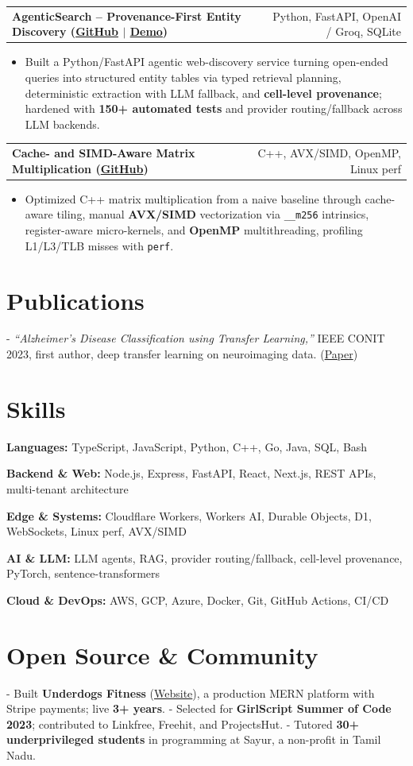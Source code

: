\documentclass[letterpaper,11pt]{article}
\makeatletter
\newcommand{\projItem}[2]{%
  \vspace{2pt}
  \begin{tabular*}{\textwidth}{@{}l@{\extracolsep{\fill}}r@{}}
    \textbf{#1} & #2 \\
  \end{tabular*}\par\vspace{-3pt}
}
\newcommand{\skillLine}[2]{\textbf{#1:} #2\par\vspace{1.5pt}}
\newcommand{\inlineBlock}[1]{{\setlength{\leftskip}{0.18in}\small #1\par}}
\makeatother
\begin{document}
\projItem{AgenticSearch -- Provenance-First Entity Discovery {\normalfont\small(\href{https://github.com/Deva-1903/ciir_agentic_search}{GitHub} $\vert$ \href{https://agentic-search-negglszkwa-uc.a.run.app}{Demo})}}{Python, FastAPI, OpenAI / Groq, SQLite}
\begin{itemize}
  \item Built a Python/FastAPI agentic web-discovery service turning open-ended queries into structured entity tables via typed retrieval planning, deterministic extraction with LLM fallback, and \textbf{cell-level provenance}; hardened with \textbf{150+ automated tests} and provider routing/fallback across LLM backends.
\end{itemize}

\projItem{Cache- and SIMD-Aware Matrix Multiplication {\normalfont\small(\href{https://github.com/Deva-1903/cs690pf}{GitHub})}}{C++, AVX/SIMD, OpenMP, Linux perf}
\begin{itemize}
  \item Optimized C++ matrix multiplication from a naive baseline through cache-aware tiling, manual \textbf{AVX/SIMD} vectorization via \texttt{\_\_m256} intrinsics, register-aware micro-kernels, and \textbf{OpenMP} multithreading, profiling L1/L3/TLB misses with \texttt{perf}.
\end{itemize}

\section{Publications}
\vspace{2pt}
\inlineBlock{- \textit{``Alzheimer's Disease Classification using Transfer Learning,''} IEEE CONIT 2023, first author, deep transfer learning on neuroimaging data. {\normalfont\small(\href{https://ieeexplore.ieee.org/document/10205760}{Paper})}}

\section{Skills}
\skillLine{Languages}{TypeScript, JavaScript, Python, C++, Go, Java, SQL, Bash}
\skillLine{Backend \& Web}{Node.js, Express, FastAPI, React, Next.js, REST APIs, multi-tenant architecture}
\skillLine{Edge \& Systems}{Cloudflare Workers, Workers AI, Durable Objects, D1, WebSockets, Linux perf, AVX/SIMD}
\skillLine{AI \& LLM}{LLM agents, RAG, provider routing/fallback, cell-level provenance, PyTorch, sentence-transformers}
\skillLine{Cloud \& DevOps}{AWS, GCP, Azure, Docker, Git, GitHub Actions, CI/CD}

\section{Open Source \& Community}
\inlineBlock{- Built \textbf{Underdogs Fitness} (\href{https://www.underdogsfitness.in/}{Website}), a production MERN platform with Stripe payments; live \textbf{3+ years}. - Selected for \textbf{GirlScript Summer of Code 2023}; contributed to Linkfree, Freehit, and ProjectsHut. - Tutored \textbf{30+ underprivileged students} in programming at Sayur, a non-profit in Tamil Nadu.}
\end{document}
